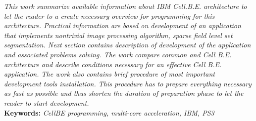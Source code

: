 \par
\textit{
This work summarize available information about IBM Cell.B.E. architecture to let the reader to a create necessary overview for programming for this architecture.
Practical information are based on development of an application that implements nontrivial image processing algorithm, sparse field level set segmentation.
Next section contains description of development of the application and associated problems solving.
The work compare common and Cell B.E. architecture and describe conditions necessary for an effective Cell B.E. application.
The work also contains brief procedure of most important development tools installation.
This procedure has to prepare everything necessary as fast as possible and thus shorten the duration of preparation phase to let the reader to start development.
}\\

\noindent
\textbf{Keywords:} \textit{CellBE programming, multi-core acceleration, IBM, PS3}

\pagebreak